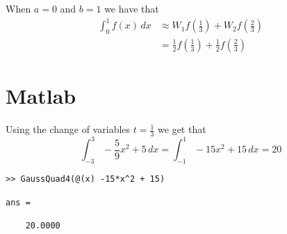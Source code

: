 \documentclass{article}
\begin{document}
When $a=0$ and $b=1$ we have that
\begin{align*}
	\int_0^1 f(x) \,dx &\approx W_1f\left(\frac{1}{3}\right) + W_2f\left(\frac{2}{3}\right)\\
	&= \frac{1}{2}f\left(\frac{1}{3}\right)  + \frac{1}{2}f\left(\frac{2}{3}\right)
\end{align*}
\newpage 

\section*{Matlab}


Using the change of variables $t = \frac{1}{3}$ we get that
\[
	\int_{-3}^3 -\frac{5}{9}x^2 + 5 \,dx = \int_{-1}^1 -15x^2 + 15 \,dx = 20
\]
\begin{verbatim}
>> GaussQuad4(@(x) -15*x^2 + 15)

ans =

	20.0000
\end{verbatim}
\newpage
\end{document}
